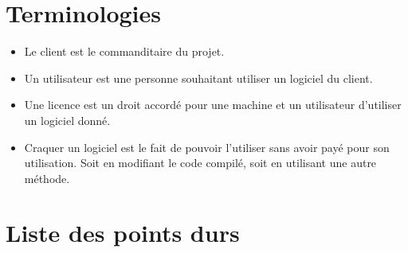 \chapter{Terminologies}

\begin{itemize}
	\item Le client est le commanditaire du projet.
	\item Un utilisateur est une personne souhaitant utiliser un logiciel du client. 
	\item Une licence est un droit accordé pour une machine et un utilisateur d'utiliser un logiciel donné.
	\item Craquer un logiciel est le fait de pouvoir l'utiliser sans avoir payé pour son utilisation. 
	Soit en modifiant le code compilé, soit en utilisant une autre méthode. 
\end{itemize}

\chapter{Liste des points durs}

